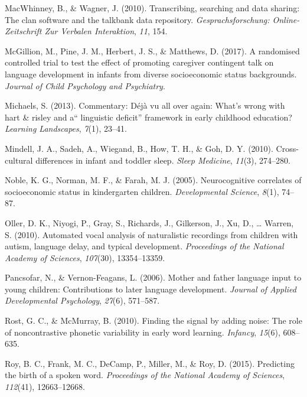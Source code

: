 \documentclass[man]{apa6}
\theoremstyle{definition}
\theoremstyle{definition}
\theoremstyle{definition}
\theoremstyle{remark}
\begin{document}
\hypertarget{ref-macwhinney2010transcribing}{}
MacWhinney, B., \& Wagner, J. (2010). Transcribing, searching and data
sharing: The clan software and the talkbank data repository.
\emph{Gesprachsforschung: Online-Zeitschrift Zur Verbalen Interaktion},
\emph{11}, 154.

\hypertarget{ref-mcgillion2017randomised}{}
McGillion, M., Pine, J. M., Herbert, J. S., \& Matthews, D. (2017). A
randomised controlled trial to test the effect of promoting caregiver
contingent talk on language development in infants from diverse
socioeconomic status backgrounds. \emph{Journal of Child Psychology and
Psychiatry}.

\hypertarget{ref-michaels2013commentary}{}
Michaels, S. (2013). Commentary: Déjà vu all over again: What's wrong
with hart \& risley and a`` linguistic deficit'' framework in early
childhood education? \emph{Learning Landscapes}, \emph{7}(1), 23--41.

\hypertarget{ref-mindell2010cross}{}
Mindell, J. A., Sadeh, A., Wiegand, B., How, T. H., \& Goh, D. Y.
(2010). Cross-cultural differences in infant and toddler sleep.
\emph{Sleep Medicine}, \emph{11}(3), 274--280.

\hypertarget{ref-noble2005neurocognitive}{}
Noble, K. G., Norman, M. F., \& Farah, M. J. (2005). Neurocognitive
correlates of socioeconomic status in kindergarten children.
\emph{Developmental Science}, \emph{8}(1), 74--87.

\hypertarget{ref-oller2010automated}{}
Oller, D. K., Niyogi, P., Gray, S., Richards, J., Gilkerson, J., Xu, D.,
\ldots{} Warren, S. (2010). Automated vocal analysis of naturalistic
recordings from children with autism, language delay, and typical
development. \emph{Proceedings of the National Academy of Sciences},
\emph{107}(30), 13354--13359.

\hypertarget{ref-pancsofar2006mother}{}
Pancsofar, N., \& Vernon-Feagans, L. (2006). Mother and father language
input to young children: Contributions to later language development.
\emph{Journal of Applied Developmental Psychology}, \emph{27}(6),
571--587.

\hypertarget{ref-rost2010finding}{}
Rost, G. C., \& McMurray, B. (2010). Finding the signal by adding noise:
The role of noncontrastive phonetic variability in early word learning.
\emph{Infancy}, \emph{15}(6), 608--635.

\hypertarget{ref-roy2015predicting}{}
Roy, B. C., Frank, M. C., DeCamp, P., Miller, M., \& Roy, D. (2015).
Predicting the birth of a spoken word. \emph{Proceedings of the National
Academy of Sciences}, \emph{112}(41), 12663--12668.
\end{document}
